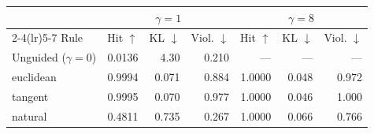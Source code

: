 \begin{tabular}{lrrrrrr}
\toprule
& \multicolumn{3}{c}{$\gamma = 1$} & \multicolumn{3}{c}{$\gamma = 8$} \\
\cmidrule(lr){2-4}\cmidrule(lr){5-7}
Rule & Hit $\uparrow$ & KL $\downarrow$ & Viol. $\downarrow$ & Hit $\uparrow$ & KL $\downarrow$ & Viol. $\downarrow$ \\
\midrule
Unguided ($\gamma{=}0$) & 0.0136 & 4.30 & 0.210 & --- & --- & --- \\
\midrule
euclidean & 0.9994 & 0.071 & 0.884 & 1.0000 & 0.048 & 0.972 \\
tangent & 0.9995 & 0.070 & 0.977 & 1.0000 & 0.046 & 1.000 \\
natural & 0.4811 & 0.735 & 0.267 & 1.0000 & 0.066 & 0.766 \\
\bottomrule
\end{tabular}